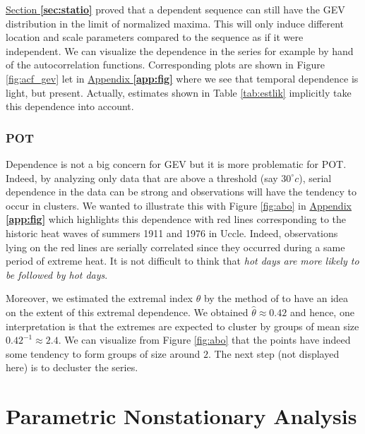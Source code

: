 \hyperref[sec:statio]{Section \textbf{\ref{sec:statio}}} proved that a dependent sequence can still have the GEV distribution in the limit of normalized maxima. This will only induce different location and scale
parameters compared to the sequence as if it were independent.
We can visualize the dependence in the series for example by hand of the autocorrelation functions. Corresponding plots are shown in Figure \ref{fig:acf_gev} let in \hyperref[app:fig]{Appendix \textbf{\ref{app:fig}}} where we see that temporal dependence is light, but present. 
Actually, estimates shown in Table \ref{tab:estlik} implicitly take this dependence into account. 

\subsubsection*{POT}

 Dependence is not a big concern for GEV but it is more problematic for POT. Indeed, by analyzing only data that are above a threshold (say $30^{\circ}c$), serial dependence in the data can be strong and observations will have the tendency to occur in clusters. We wanted to illustrate this with Figure \ref{fig:abo} in \hyperref[app:fig]{Appendix \textbf{\ref{app:fig}}} which highlights this dependence with red lines corresponding to the historic heat waves of summers 1911 and 1976 in Uccle. Indeed, observations lying on the red lines are serially correlated since they occurred during a same period of extreme heat. It is not difficult to think that \emph{hot days are more likely to be followed by hot days}.
 
Moreover, we estimated the extremal index $\theta$ by the method of \citet{ferro_inference_2003} to have an idea on the extent of this extremal dependence. We obtained $\hat{\theta}\approx 0.42$ and hence, one interpretation is that the extremes are expected to cluster by groups of mean size $0.42^{-1}\approx 2.4$. We can visualize from Figure \ref{fig:abo} that the points have indeed some tendency to form groups of size around $2$. The next step (not displayed here) is to decluster the series.



\section{Parametric Nonstationary Analysis}\label{sec:xpnp}


